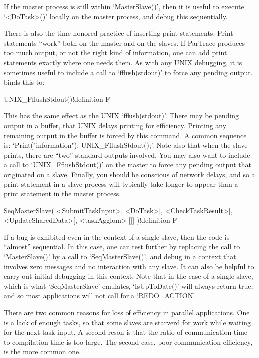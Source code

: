 If the master process is still within `MasterSlave()', then it is  useful
to execute `<DoTask>()' locally on the master  process,  and  debug  this
sequentially.

There is also the time-honored practice of  inserting  print  statements.
Print statements ``work'' both on  the  master  and  on  the  slaves.  If
ParTrace produces too much output, or not the right kind of  information,
one can add print statements exactly where one needs them.  As  with  any
UNIX  debugging,  it  is  sometimes  useful  to   include   a   call   to
`fflush(stdout)' to force any pending output. {\ParGAP} binds this to:

\>UNIX_FflushStdout()!{definition} F

This has the same effect as  the  UNIX  `fflush(stdout)'.  There  may  be
pending output in a buffer, that UNIX  delays  printing  for  efficiency.
Printing any remaining output in the buffer is forced by this command.  A
common sequence is:  `Print("information");  UNIX_FflushStdout();'.  Note
also that when the slave  prints,  there  are  ``two''  standard  outputs
involved. You may also want to include a call to `UNIX_FflushStdout()' on
the master to force any  pending  output  that  originated  on  a  slave.
Finally, you should be conscious  of  network  delays,  and  so  a  print
statement in a slave process will typically take longer to appear than  a
print statement in the master process.

\>SeqMasterSlave( <SubmitTaskInput>, <DoTask>[, <CheckTaskResult>[,%
                  <UpdateSharedData>[, <taskAgglom> ]]] )!{definition} F

If a bug is exhibited even in the context of a  single  slave,  then  the
code is ``almost'' sequential. In this case,  one  can  test  further  by
replacing the call to `MasterSlave()' by a  call  to  `SeqMasterSlave()',
and debug in a context that involves zero  messages  and  no  interaction
with any slave. It can also be helpful to carry out initial debugging  in
this context. Note that in the case of a  single  slave,  which  is  what
`SeqMasterSlave' emulates, `IsUpToDate()' will always return true, and so
most applications will not call for a `REDO_ACTION'.


There  are  two  common  reasons  for  loss  of  efficiency  in  parallel
applications. One is a lack of enough tasks,  so  that  some  slaves  are
starverd for work while waiting for the next task input. A  second  reson
is that the ratio of communication time to compilation time is too large.
The second case, poor communication efficiency, is the more common one.

